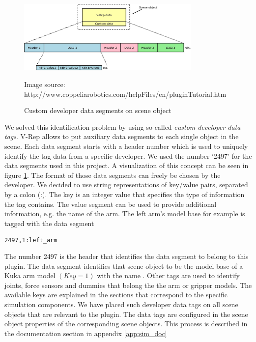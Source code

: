 \begin{figure}[h]
	\centering
  	\includegraphics[width=0.8\textwidth]{images/custom_dev_data.jpg}
	\caption{Custom developer data segments on scene object}
	{\scriptsize Image source: http://www.coppeliarobotics.com/helpFiles/en/pluginTutorial.htm}
	\label{fig:cust_dev_data}
\end{figure}

We solved this identification problem by using so called \emph{custom developer data tags}. V-Rep allows to put auxiliary data segments to each single object in the scene. Each data segment starts with a header number which is used to uniquely identify the tag data from a specific developer. We used the number `2497' for the data segments used in this project. A visualization of this concept can be seen in figure \ref{fig:cust_dev_data}. The format of those data segments can freely be chosen by the developer. We decided to use string representations of key/value pairs, separated by a colon (:). The key is an integer value that specifies the type of information the tag contains. The value segment can be used to provide additional information, e.g. the name of the arm. The left arm's model base for example is tagged with the data segment 
\begin{center}
\texttt{2497,1:left\_arm}
\end{center}
The number 2497 is the header that identifies the data segment to belong to this plugin. The data segment identifies that scene object to be the model base of a Kuka arm model $(Key=1)$ with the name . Other tags are used to identify joints, force sensors and dummies that belong the the arm or gripper models. The available keys are explained in the sections that correspond to the specific simulation components. We have placed such developer data tags on all scene objects that are relevant to the plugin. The data tags are configured in the scene object properties of the corresponding scene objects. This process is described in the documentation section in appendix \ref{app:sim_doc} \\

